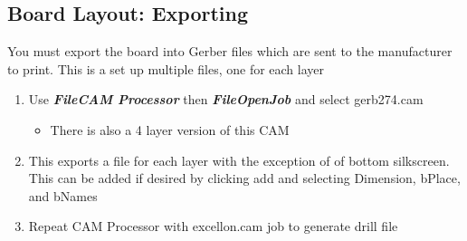 \documentclass{article}
\begin{document}
\subsection{Board Layout: Exporting}
You must export the board into Gerber files which are sent to the manufacturer to print. This is a set up multiple files, one for each layer
\begin{enumerate}
    \item Use \textit{\textbf{File\textrightarrow CAM Processor}} then \textit{\textbf{File\textrightarrow Open\textrightarrow Job}} and select gerb274.cam
    \begin{itemize}
        \item There is also a 4 layer version of this CAM
    \end{itemize}
    \item This exports a file for each layer with the exception of of bottom silkscreen. This can be added if desired by clicking add and selecting Dimension, bPlace, and bNames
    \item Repeat CAM Processor with excellon.cam job to generate drill file
\end{enumerate}

\end{document}
